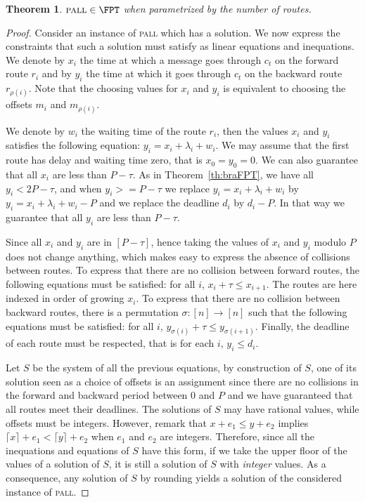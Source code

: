 \documentclass[10pt, conference, letterpaper]{IEEEtran}
\newtheorem{theorem}{Theorem}
\newcommand\pall{\textsc{pall}\xspace}
\begin{document}
\begin{theorem}\label{th:pallFPT}
$\pall \in \FPT$ when parametrized by the number of routes.
\end{theorem}
\begin{proof}
 Consider an instance of \pall which has a solution. We now express the constraints that such a solution
 must satisfy as linear equations and inequations. 
 We denote by $x_i$ the time at which a message goes through $c_t$ on the forward route $r_i$ 
 and by $y_i$ the time at which it goes through $c_t$ on the backward route $r_{\rho(i)}$.
 Note that the choosing values for $x_i$ and $y_i$ is equivalent to choosing the offsets $m_i$ and $m_{\rho(i)}$.
 
 We denote by $w_i$ the waiting time of the route $r_i$, then the values $x_i$ and $y_i$
satisfies the following equation: $y_i = x_i + \lambda_i + w_i$.
We may assume that the first route has delay and waiting time zero, 
that is $x_0 = y_0 = 0$. We can also guarantee that all $x_i$ are less than $P-\tau$.
As in Theorem~\ref{th:braFPT}, we have all $y_i < 2P - \tau$,
and  when $y_i >= P - \tau$ we replace $y_i = x_i + \lambda_i + w_i$
by $y_i = x_i + \lambda_i + w_i - P$ and we replace the deadline $d_i$ by $d_i -P$.
In that way we guarantee that all $y_i$ are less than $P-\tau$.  
 
 Since all $x_i$ and $y_i$ are in $[P-\tau]$, hence taking the values of $x_i$ and $y_i$ modulo $P$
 does not change anything, which makes easy to express the absence of collisions between routes.
 To express that there are no collision between forward routes, the following equations must be  satisfied: for all $i$, $x_i + \tau \leq x_{i+1}$. The routes are here indexed in order of growing $x_i$.
 To express that there are no collision between backward routes, there is a permutation $\sigma : [n] \rightarrow [n]$ such that the following equations must be  satisfied: for all $i$, $y_{\sigma(i)} + \tau \leq y_{\sigma(i+1)}$.
 Finally, the deadline of each route must be respected, that is for each $i$, $y_i \leq d_i$. 

 Let $S$ be the system of all the previous equations, by construction of $S$, one of its solution seen as a choice of offsets 
is an assignment since there are no collisions in the forward and backward period between $0$ and $P$ and we have guaranteed that 
all routes meet their deadlines.
The solutions of $S$ may have rational values, while offsets must be integers. 
However, remark that $x +e_1 \leq y + e_2$ implies $\lceil x \rceil +e_1 < \lceil y \rceil + e_2$ when $e_1$ and $e_2$ are integers.
Therefore, since all the inequations and equations of $S$ have this form, if we take the upper floor of the values of a solution of $S$, it is still a solution of $S$ with \emph{integer} values. As a consequence, any solution of $S$ by rounding yields a solution of the considered instance of \pall.


\end{proof}
\end{document}
